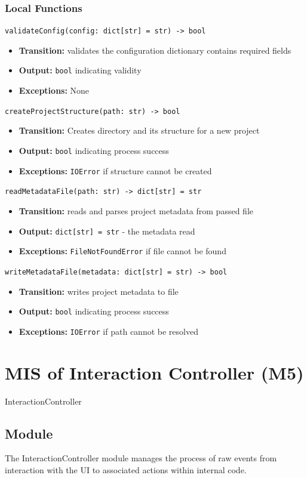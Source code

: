 \documentclass[12pt, titlepage]{article}
\begin{document}
\subsubsection{Local Functions}
\texttt{validateConfig(config: dict[str] = str) -> bool}
\begin{itemize}
  \item \textbf{Transition:} validates the configuration dictionary contains required fields
  \item \textbf{Output:} \texttt{bool} indicating validity
  \item \textbf{Exceptions:} None
\end{itemize}
\texttt{createProjectStructure(path: str) -> bool}
\begin{itemize}
  \item \textbf{Transition:} Creates directory and its structure for a new project
  \item \textbf{Output:} \texttt{bool} indicating process success
  \item \textbf{Exceptions:} \texttt{IOError} if structure cannot be created
\end{itemize}
\texttt{readMetadataFile(path: str) -> dict[str] = str}
\begin{itemize}
  \item \textbf{Transition:} reads and parses project metadata from passed file
  \item \textbf{Output:} \texttt{dict[str] = str} - the metadata read
  \item \textbf{Exceptions:} \texttt{FileNotFoundError} if file cannot be found
\end{itemize}
\texttt{writeMetadataFile(metadata: dict[str] = str) -> bool}
\begin{itemize}
  \item \textbf{Transition:} writes project metadata to file
  \item \textbf{Output:} \texttt{bool} indicating process success
  \item \textbf{Exceptions:} \texttt{IOError} if path cannot be resolved
\end{itemize}

\newpage


\section{MIS of Interaction Controller (M5)}\label{Module7} 

InteractionController

\subsection{Module}
The InteractionController module manages the process of raw events from interaction with the UI to associated actions within internal code.
\end{document}
